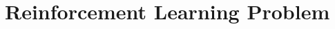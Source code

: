 \documentclass[draft,final]{vutinfth} %
\begin{document}
    \chapter{Reinforcement Learning Problem}

    \backmatter
    \listoffigures %

    \cleardoublepage %
    \listoftables %

    \listofalgorithms

    \printindex

    \printglossaries

    
    
\end{document}
